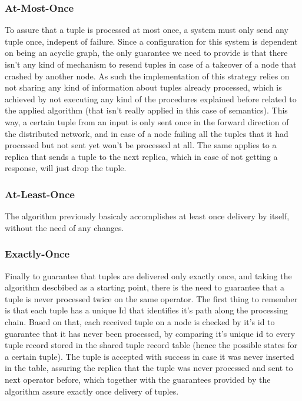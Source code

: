 \documentclass[times, 10pt,twocolumn]{article}
\newcommand{\forceindent}{\leavevmode{\parindent=1em\indent}}
\begin{document}



\subsubsection{At-Most-Once}

\forceindent To assure that a tuple is processed at most once, a system
must only send any tuple once, indepent of failure. Since a configuration
for this system is dependent on being an acyclic graph, the only guarantee
we need to provide is that there isn't any kind of mechanism to resend
tuples in case of a takeover of a node that crashed by another node.  As
such the implementation of this strategy relies on not sharing any kind of
information about tuples already processed, which is achieved by not
executing any kind of the procedures explained before related to the
applied algorithm (that isn't really applied in this case of semantics).
This way, a certain tuple from an input is only sent once in the forward
direction of the distributed network, and in case of a node failing all
the tuples that it had processed but not sent yet won't be processed at
all. The same applies to a replica that sends a tuple to the next replica,
which in case of not getting a response, will just drop the tuple.

\subsubsection{At-Least-Once}

\forceindent The algorithm previously basicaly accomplishes at least once
delivery by itself, without the need of any changes. 

\subsubsection{Exactly-Once}

\forceindent Finally to guarantee that tuples are delivered only exactly
once, and taking the algorithm descbibed as a starting point, there is the
need to guarantee that a tuple is never processed twice on the same
operator. The first thing to remember is that each tuple has a unique Id
that identifies it's path along the processing chain. Based on that, each
received tuple on a node is checked by it's id to guarantee that it has
never been processed, by comparing it's unique id to every tuple record
stored in the shared tuple record table (hence the possible states for a
certain tuple).  The tuple is accepted with success in case it was never
inserted in the table, assuring the replica that the tuple was never
processed and sent to next operator before, which together with the
guarantees provided by the algorithm assure exactly once delivery of
tuples.
\end{document}
